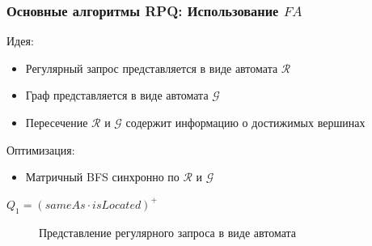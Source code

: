 \documentclass{beamer}
\begin{document}
\begin{frame}[fragile]
  \frametitle{Основные алгоритмы RPQ: Использование $FA$}
  Идея:
  \begin{itemize}
    \item Регулярный запрос представляется в виде автомата $\mathcal{R}$
    \item Граф представляется в виде автомата $\mathcal{G}$
    \item Пересечение $\mathcal{R}$ и $\mathcal{G}$ содержит информацию о достижимых вершинах
  \end{itemize}
  Оптимизация:
  \begin{itemize}
    \item Матричный BFS синхронно по $\mathcal{R}$ и $\mathcal{G}$
  \end{itemize}
  \vspace{2em}
  \begin{center}
      $Q_1 = (sameAs \cdot isLocated)^+$
  \end{center}
  \noindent\begin{minipage}{1\textwidth}
  \begin{figure}
  \vspace{1em}
  \vspace{1em}
  \caption{Представление регулярного запроса в виде автомата}
  \end{figure}
  \end{minipage}
\end{frame}
\end{document}
